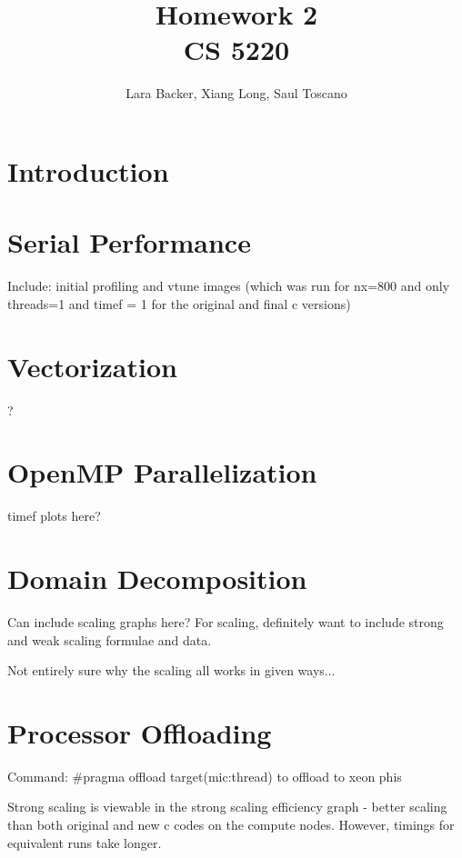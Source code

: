 \documentclass{article}
\begin{document}
\title{Homework 2\\CS 5220}
\author{Lara Backer, Xiang Long, Saul Toscano}

\maketitle

\section*{Introduction}



\section*{Serial Performance}

Include: initial profiling and vtune images (which was run for nx=800 and only threads=1 and timef = 1 for the original and final c versions)


\section*{Vectorization}
?

\section*{OpenMP Parallelization }
timef plots here? 

\section*{Domain Decomposition}
Can include scaling graphs here? For scaling, definitely want to include strong and weak scaling formulae and data. 

Not entirely sure why the scaling all works in given ways...

\section*{Processor Offloading}
Command: \#pragma offload target(mic:thread) to offload to xeon phis

Strong scaling is viewable in the strong scaling efficiency graph - better scaling than both original and new c codes on the compute nodes. However, timings for equivalent runs take longer.
\end{document}
